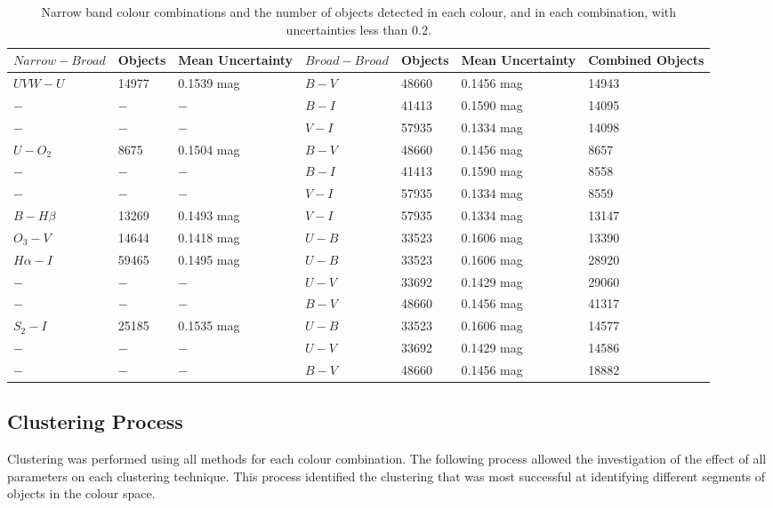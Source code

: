 \begin{table}
\centering
\caption{Narrow band colour combinations and the number of objects detected in each colour, and in each combination, with uncertainties less than $0.2$.}
\label{tab:NBcolourcombos}
\begin{tabular}{lllllll}
\hline\hline
$Narrow - Broad$ & Objects & Mean Uncertainty & $Broad - Broad$ & Objects & Mean Uncertainty & Combined Objects \\
\hline
$UVW - U$ &  14977 & 0.1539 mag & $B - V$ &  48660 & 0.1456 mag & 14943 \\
$ - $ & $ - $ & $ - $ & $B - I$ &  41413 & 0.1590 mag & 14095 \\
$ - $ & $ - $ & $ - $ & $V - I$ &  57935 & 0.1334 mag & 14098 \\
\hline
$U - O_{2}$ & 8675 & 0.1504 mag & $B - V$ &  48660 & 0.1456 mag & 8657 \\
$ - $ & $ - $ & $ - $ & $B - I$ &  41413 & 0.1590 mag & 8558 \\
$ - $ & $ - $ & $ - $ & $V - I$ &  57935 & 0.1334 mag & 8559 \\
\hline
$B - H\beta$ & 13269 & 0.1493 mag & $V - I$ &  57935 & 0.1334 mag & 13147 \\
\hline
$O_{3} - V$ & 14644 & 0.1418 mag & $U - B$ &  33523 & 0.1606 mag & 13390 \\
\hline
$H\alpha - I$ & 59465 & 0.1495 mag & $U - B$ &  33523 & 0.1606 mag & 28920 \\
$ - $ & $ - $ & $ - $ & $U - V$ &  33692 & 0.1429 mag & 29060 \\
$ - $ & $ - $ & $ - $ & $B - V$ &  48660 & 0.1456 mag & 41317 \\
\hline
$S_{2} - I$ & 25185 & 0.1535 mag & $U - B$ &  33523 & 0.1606 mag & 14577 \\
$ - $ & $ - $ & $ - $ & $U - V$ &  33692 & 0.1429 mag & 14586 \\
$ - $ & $ - $ & $ - $ & $B - V$ &  48660 & 0.1456 mag & 18882 \\
\hline
\end{tabular}
\end{table}

\subsection{Clustering Process}
Clustering was performed using all methods for each colour combination. 
The following process allowed the investigation of the effect of all parameters on each clustering technique.
This process identified the clustering that was most successful at identifying different segments of objects in the colour space.

